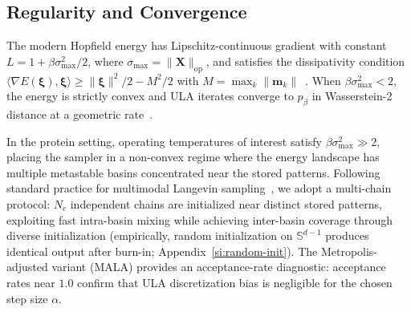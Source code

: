 \subsection{Regularity and Convergence}\label{sec:convergence}
The modern Hopfield energy has Lipschitz-continuous gradient with constant $L = 1 + \beta\sigma_{\max}^2/2$, where $\sigma_{\max} = \|\mathbf{X}\|_{\mathrm{op}}$, and satisfies the dissipativity condition $\langle \nabla E(\boldsymbol{\xi}), \boldsymbol{\xi} \rangle \geq \|\boldsymbol{\xi}\|^2/2 - M^2/2$ with $M = \max_k \|\mathbf{m}_k\|$~\cite{alswaidanVarnerStochasticAttention2026}. When $\beta\sigma_{\max}^2 < 2$, the energy is strictly convex and ULA iterates converge to $p_\beta$ in Wasserstein-2 distance at a geometric rate~\cite{dalalyanTheoreticalGuaranteesApproximate2017,durmusNonasymptoticAnalysisUnadjusted2017}.

In the protein setting, operating temperatures of interest satisfy $\beta\sigma_{\max}^2 \gg 2$, placing the sampler in a non-convex regime where the energy landscape has multiple metastable basins concentrated near the stored patterns. Following standard practice for multimodal Langevin sampling~\cite{bovier2004metastability}, we adopt a multi-chain protocol: $N_c$ independent chains are initialized near distinct stored patterns, exploiting fast intra-basin mixing while achieving inter-basin coverage through diverse initialization (empirically, random initialization on $\mathbb{S}^{d-1}$ produces identical output after burn-in; Appendix~\ref{si:random-init}). The Metropolis-adjusted variant (MALA) provides an acceptance-rate diagnostic: acceptance rates near $1.0$ confirm that ULA discretization bias is negligible for the chosen step size $\alpha$.
